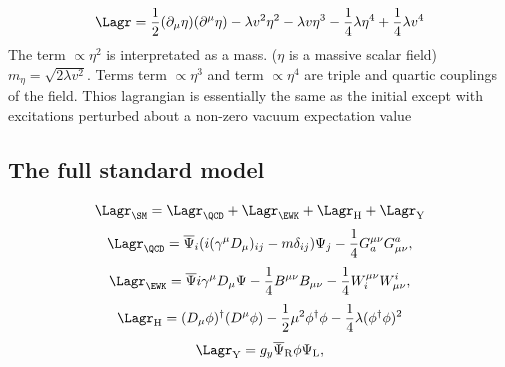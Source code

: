 \begin{equation*}
	\Lagr = \frac{1}{2}(\partial_{\mu}\eta)(\partial^{\mu}\eta) - \lambda v^2\eta^2 - \lambda v\eta^3 - \frac{1}{4}\lambda \eta^4 + \frac{1}{4}\lambda v^4 
\end{equation*}
The term $\propto\eta^2$ is interpretated as a mass. ($\eta$ is a massive scalar field) $m_{\eta} = \sqrt{2\lambda v^2}$.
Terms term $\propto\eta^3$ and term $\propto\eta^4$ are triple and quartic couplings of the field.
Thios lagrangian is essentially the same as the initial except with excitations perturbed about a non-zero vacuum expectation value

\subsection{The full standard model} %
\label{sub:the_full_standard_model}
\begin{equation*}
	\Lagr_{\SM} = \Lagr_{\QCD} + \Lagr_{\EWK} + \Lagr_{\mathrm{H}} + \Lagr_{\mathrm{Y}}
\end{equation*}
\begin{equation*}
	\Lagr_{\QCD}=\overline{\Psi}_{i}(i(\gamma^{\mu}D_{\mu})_{ij}-m\delta_{ij})\Psi_{j} - \frac{1}{4}G^{\mu \nu}_{a}G^{a}_{\mu \nu},
\end{equation*}
\begin{equation*}
\Lagr_{\EWK}=\overline{\Psi}i\gamma^{\mu}D_{\mu}\Psi - \frac{1}{4}B^{\mu\nu}B_{\mu\nu} - \frac{1}{4}W^{\mu\nu}_{i}W_{\mu\nu}^{i},
\end{equation*}
\begin{equation*}
	\Lagr_{\mathrm{H}}=(D_{\mu}\phi)^{\dagger}(D^{\mu}\phi)-\frac{1}{2}\mu^{2}\phi^{\dagger}\phi - \frac{1}{4}\lambda(\phi^{\dagger}\phi)^{2}
\end{equation*}
\begin{equation*}
	\Lagr_{\mathrm{Y}} = g_{y}\overline{\Psi}_{\mathrm{R}}\phi\Psi_{\mathrm{L}}, 
\end{equation*}


